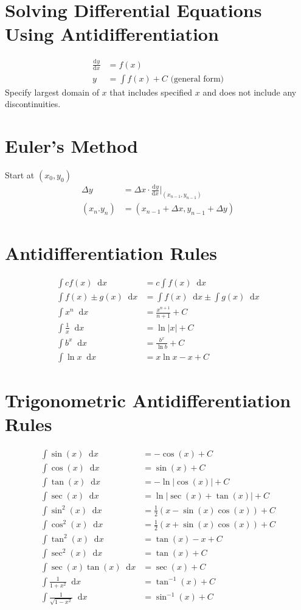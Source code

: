 \documentclass[12pt]{article}
\newcommand*{\rmaskip}{\setlength{\abovedisplayskip}{0pt}}
\newcommand*{\rmbskip}{\setlength{\belowdisplayskip}{0pt}}
\newcommand*{\rmskip}{\rmaskip \rmbskip}
\newcommand*{\dd}[3][]{\tfrac{\mathrm{d}^{#1}#2}{\mathrm{d}#3^{#1}}}
\newcommand*{\D}[1]{\mathop{}\!\mathrm{d} #1}
\begin{document}
\section*{Solving Differential Equations Using Antidifferentiation}
{\rmaskip\begin{align*}
  \dd{y}{x} &= f(x)\\
  y &= \int f(x) + C \text{ (general form)}
\end{align*}}%
Specify largest domain of \(x\) that includes specified \(x\) and does not
include any discontinuities.
\section*{Euler's Method}
Start at \((x_0,y_0)\)
{\rmbskip\begin{align*}
  \Delta y &= \Delta x \cdot \dd{y}{x} \biggr|_{(x_{n-1},y_{n-1})} \\
  (x_n.y_n) &= (x_{n-1} + \Delta x, y_{n-1} + \Delta y)
\end{align*}}%
\section*{Antidifferentiation Rules}
{\rmskip\begin{align*}
  \int cf(x) \D{x} &= c \int f(x) \D{x}\\
  \int f(x) \pm g(x) \D{x} &= \int f(x) \D{x} \pm \int g(x) \D{x}\\
  \int x^n \D{x} &= \frac{x^{n+1}}{n+1} + C\\
  \int \frac{1}{x} \D{x} &= \ln|x| + C\\
  \int b^x \D{x} &= \frac{b^x}{\ln b} + C\\
  \int \ln x \D{x} &= x\ln x - x + C
\end{align*}}%
\section*{Trigonometric Antidifferentiation Rules}
{\rmskip\begin{align*}
  \int \sin(x) \D{x} &= -\cos(x) + C\\
  \int \cos(x) \D{x} &= \sin(x) + C\\
  \int \tan(x) \D{x} &= -\ln|\cos(x)| + C\\
  \int \sec(x) \D{x} &= \ln|\sec(x)+\tan(x)| + C\\
  \int \sin^2(x) \D{x} &= \frac{1}{2} (x - \sin(x)\cos(x)) + C\\
  \int \cos^2(x) \D{x} &= \frac{1}{2} (x + \sin(x)\cos(x)) + C\\
  \int \tan^2(x) \D{x} &= \tan(x) - x + C\\
  \int \sec^2(x) \D{x} &= \tan(x) + C\\
  \int \sec(x) \tan(x) \D{x} &= \sec(x) + C\\
  \int \frac{1}{1+x^2} \D{x} &= \tan^{-1}(x) + C\\
  \int \frac{1}{\sqrt{1-x^2}} \D{x} &= \sin^{-1}(x) + C
\end{align*}}%
\end{document}
